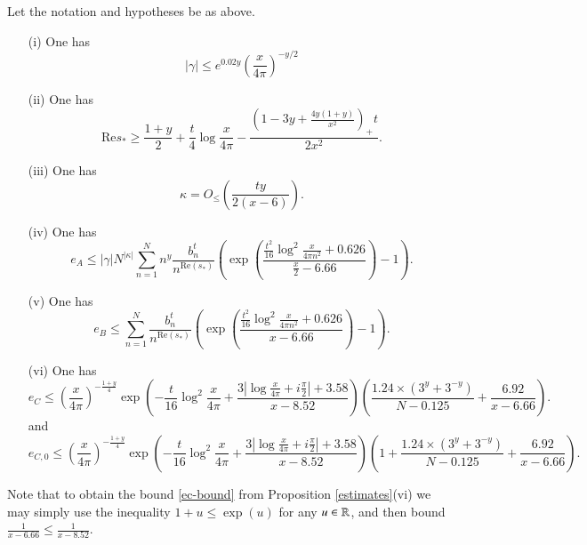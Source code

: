 \begin{proposition}[Estimates]\label{estimates}  Let the notation and hypotheses be as above. 
\begin{itemize}
\item[(i)]  One has
$$ |\gamma| \leq e^{0.02 y} \left( \frac{x}{4\pi} \right)^{-y/2} $$
\item[(ii)] One has
$$ \mathrm{Re} s_* \geq \frac{1+y}{2} +\frac{t}{4} \log \frac{x}{4\pi} - \frac{(1-3y+\frac{4y(1+y)}{x^2})_+ t}{2x^2}.$$
\item[(iii)]  One has
$$ \kappa = O_{\leq} \left( \frac{ty}{2(x-6)} \right).$$
\item[(iv)]  One has
$$ e_A \leq |\gamma| N^{|\kappa|} \sum_{n=1}^N n^{y} \frac{b_n^t}{n^{\mathrm{Re}(s_*)}} \left( \exp\left( \frac{\frac{t^2}{16} \log^2 \frac{x}{4\pi n^2} + 0.626}{\frac{x}{2}-6.66} \right)-1 \right).$$
\item[(v)]  One has
$$ e_B \leq \sum_{n=1}^N  \frac{b_n^t}{n^{\mathrm{Re}(s_*)}} \left( \exp\left( \frac{\frac{t^2}{16} \log^2 \frac{x}{4\pi n^2} + 0.626}{x-6.66} \right)-1 \right).$$
\item[(vi)] One has
$$ e_{C} \leq \left(\frac{x}{4\pi}\right)^{-\frac{1+y}{4}} \exp\left( - \frac{t}{16} \log^2 \frac{x}{4\pi} + \frac{3 |\log \frac{x}{4\pi} + i \frac{\pi}{2}|+3.58}{x-8.52} \right) \left(\frac{1.24 \times (3^y+3^{-y})}{N-0.125} + \frac{6.92}{x-6.66}\right).
$$
and
$$ e_{C,0} \leq \left(\frac{x}{4\pi}\right)^{-\frac{1+y}{4}} \exp\left( - \frac{t}{16} \log^2 \frac{x}{4\pi} + \frac{3 |\log \frac{x}{4\pi} + i \frac{\pi}{2}|+3.58}{x-8.52} \right) \left(1 + \frac{1.24 \times (3^y+3^{-y})}{N-0.125} + \frac{6.92}{x-6.66}\right).
$$
\end{itemize}
\end{proposition}

Note that to obtain the bound \eqref{ec-bound} from Proposition \ref{estimates}(vi) we may simply use the inequality $1+u \leq \exp(u)$ for any $u \in \mathbb{R}$, and then bound $\frac{1}{x-6.66} \leq \frac{1}{x-8.52}$.

